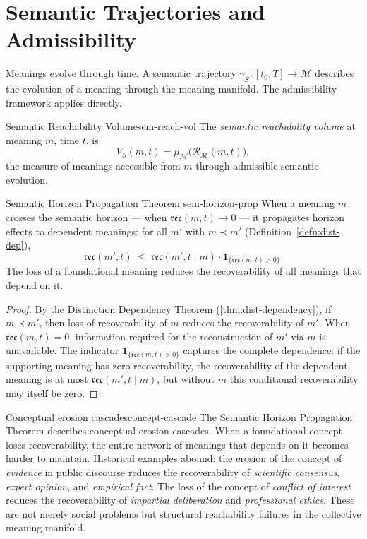 \documentclass[12pt,twoside,openright]{book}
\newcommand{\reach}{\mathcal{R}}
\newcommand{\reco}{\mathfrak{rec}}
\begin{document}
\section{Semantic Trajectories and Admissibility}

Meanings evolve through time. A semantic trajectory
$\gamma_S : [t_0, T] \to \mathcal{M}$ describes the
evolution of a meaning through the meaning manifold.
The admissibility framework applies directly.

\begin{definition}{Semantic Reachability Volume}{sem-reach-vol}
  The \emph{semantic reachability volume} at meaning $m$,
  time $t$, is
  \[
    V_S(m, t)
    = \mu_\mathcal{M}\!\bigl(\reach_\mathcal{M}(m, t)\bigr),
  \]
  the measure of meanings accessible from $m$ through
  admissible semantic evolution.
\end{definition}

\begin{theorem}{Semantic Horizon Propagation Theorem}%
  {sem-horizon-prop}
  When a meaning $m$ crosses the semantic horizon —
  when $\reco(m, t) \to 0$ — it propagates horizon
  effects to dependent meanings:
  for all $m'$ with $m \prec m'$
  (Definition~\ref{defn:dist-dep}),
  \[
    \reco(m', t)
    \;\le\;
    \reco(m', t \mid m)
    \cdot \mathbf{1}_{\{\reco(m,t)>0\}}.
  \]
  The loss of a foundational meaning reduces the
  recoverability of all meanings that depend on it.
\end{theorem}

\begin{proof}
  By the Distinction Dependency Theorem
  (\cref{thm:dist-dependency}), if $m \prec m'$,
  then loss of recoverability of $m$ reduces the
  recoverability of $m'$.
  When $\reco(m, t) = 0$, information required for
  the reconstruction of $m'$ via $m$ is unavailable.
  The indicator $\mathbf{1}_{\{\reco(m,t)>0\}}$
  captures the complete dependence: if the supporting
  meaning has zero recoverability, the recoverability
  of the dependent meaning is at most
  $\reco(m', t \mid m)$, but without $m$ this
  conditional recoverability may itself be zero.
\end{proof}

\begin{remark}{Conceptual erosion cascades}{concept-cascade}
  The Semantic Horizon Propagation Theorem describes
  conceptual erosion cascades.
  When a foundational concept loses recoverability,
  the entire network of meanings that depends on it
  becomes harder to maintain.
  Historical examples abound:
  the erosion of the concept of \emph{evidence}
  in public discourse reduces the recoverability of
  \emph{scientific consensus}, \emph{expert opinion},
  and \emph{empirical fact}.
  The loss of the concept of \emph{conflict of interest}
  reduces the recoverability of \emph{impartial
  deliberation} and \emph{professional ethics}.
  These are not merely social problems but structural
  reachability failures in the collective meaning manifold.
\end{remark}
\end{document}
